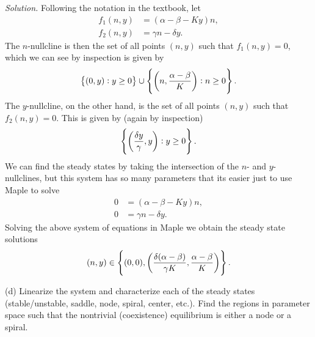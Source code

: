 \documentclass{article}
\begin{document}
\textit{Solution.}
Following the notation in the textbook, let
%
\begin{align*}
    f_1(n, y) &= (\alpha - \beta - K y) n, \\
    f_2(n, y) &= \gamma n - \delta y
    .
\end{align*}
%
The $n$-nullcline is then the set of all points $(n, y)$ such that
$f_1(n, y) = 0$, which we can see by inspection is given by
%
\begin{equation*}
    \cbr{(0, y): y \geq 0} \cup \cbr{\del{n, \frac{\alpha - \beta}{K}}: n \geq 0}
    .
\end{equation*}
%
The $y$-nullcline, on the other hand, is the set of all points $(n, y)$
such that $f_2(n, y) = 0$. This is given by (again by inspection)
%
\begin{equation*}
    \cbr{\del{\frac{\delta y}{\gamma}, y}: y \geq 0}
    .
\end{equation*}
%
We can find the steady states by taking the intersection of the $n$- and
$y$-nullclines, but this system has so many parameters that its easier
just to use Maple to solve
%
\begin{align*}
    0 &= (\alpha - \beta - K y) n, \\
    0 &= \gamma n - \delta y.
\end{align*}
%
Solving the above system of equations in Maple we obtain the steady state
solutions
%
\begin{equation*}
    (n, y) \in \cbr{
        (0, 0),
        \del{
            \frac{\delta (\alpha - \beta)}{\gamma K},
            \frac{\alpha - \beta}{K}
        }}
        .
\end{equation*}

\vspace{5mm}

(d) Linearize the system and characterize each of the steady states
(stable/unstable, saddle, node, spiral, center, etc.). Find the regions
in parameter space such that the nontrivial (coexistence) equilibrium is
either a node or a spiral.
\end{document}
